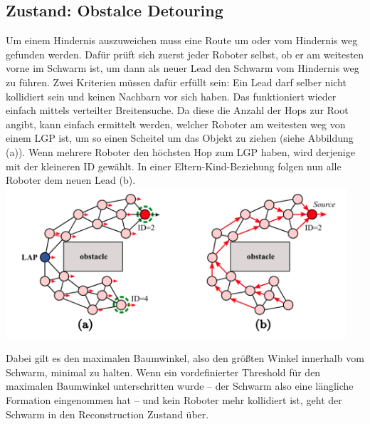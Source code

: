 \subsection{Zustand: Obstalce Detouring}

Um einem Hindernis auszuweichen muss eine Route um oder vom Hindernis weg gefunden werden. Dafür prüft
sich zuerst jeder Roboter selbst, ob er am weitesten vorne im Schwarm ist, um dann als neuer Lead den 
Schwarm vom Hindernis weg zu führen. 
Zwei Kriterien müssen dafür erfüllt sein: Ein Lead darf selber nicht kollidiert sein und keinen Nachbarn
vor sich haben.
Das funktioniert wieder einfach
mittels verteilter Breitensuche. Da diese die Anzahl der Hops zur Root angibt, kann einfach ermittelt werden,
welcher Roboter am weitesten weg von einem LGP ist, um so einen Scheitel um das Objekt zu ziehen (siehe
Abbildung (a)).
Wenn mehrere Roboter den höchsten Hop zum LGP haben, wird derjenige mit der kleineren ID
gewählt. In einer Eltern-Kind-Beziehung folgen nun alle Roboter dem neuen Lead (b).\\

\includegraphics[width=5in]{images/Screenshot 2023-02-20 at 1.25.24 PM.png}

Dabei gilt es den maximalen
Baumwinkel, also den größten Winkel innerhalb vom Schwarm, minimal zu halten. Wenn ein vordefinierter 
Threshold für den maximalen Baumwinkel unterschritten wurde – der Schwarm also eine längliche Formation
eingenommen hat – und kein Roboter mehr kollidiert ist, geht der
Schwarm in den Reconstruction Zustand über.